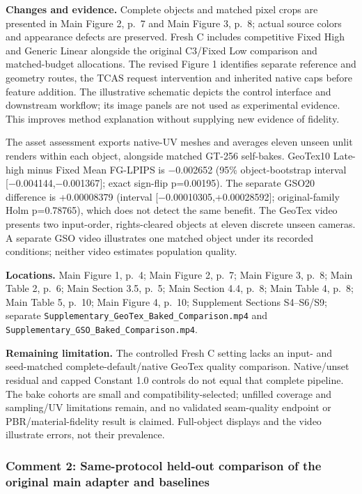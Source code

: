 \documentclass[
  10pt,
]{article}
\begin{document}
\textbf{Changes and evidence.} Complete objects and matched pixel crops
are presented in Main Figure 2, p.~7 and Main Figure 3, p.~8; actual
source colors and appearance defects are preserved. Fresh C includes
competitive Fixed High and Generic Linear alongside the original
C3/Fixed Low comparison and matched-budget allocations. The revised
Figure 1 identifies separate reference and geometry routes, the TCAS
request intervention and inherited native caps before feature addition.
The illustrative schematic depicts the control interface and downstream
workflow; its image panels are not used as experimental evidence. This
improves method explanation without supplying new evidence of fidelity.

The asset assessment exports native-UV meshes and averages eleven unseen
unlit renders within each object, alongside matched GT-256 self-bakes.
GeoTex10 Late-high minus Fixed Mean FG-LPIPS is −0.002652 (95\%
object-bootstrap interval {[}−0.004144,−0.001367{]}; exact sign-flip
p=0.00195). The separate GSO20 difference is +0.00008379 (interval
{[}−0.00010305,+0.00028592{]}; original-family Holm p=0.78765), which
does not detect the same benefit. The GeoTex video presents two
input-order, rights-cleared objects at eleven discrete unseen cameras. A
separate GSO video illustrates one matched object under its recorded
conditions; neither video estimates population quality.

\textbf{Locations.} Main Figure 1, p.~4; Main Figure 2, p.~7; Main
Figure 3, p.~8; Main Table 2, p.~6; Main Section 3.5, p.~5; Main Section
4.4, p.~8; Main Table 4, p.~8; Main Table 5, p.~10; Main Figure 4,
p.~10; Supplement Sections S4--S6/S9; separate
\texttt{Supplementary\_GeoTex\_Baked\_Comparison.mp4} and
\texttt{Supplementary\_GSO\_Baked\_Comparison.mp4}.

\textbf{Remaining limitation.} The controlled Fresh C setting lacks an
input- and seed-matched complete-default/native GeoTex quality
comparison. Native/unset residual and capped Constant 1.0 controls do
not equal that complete pipeline. The bake cohorts are small and
compatibility-selected; unfilled coverage and sampling/UV limitations
remain, and no validated seam-quality endpoint or PBR/material-fidelity
result is claimed. Full-object displays and the video illustrate errors,
not their prevalence.

\hypertarget{comment-2-same-protocol-held-out-comparison-of-the-original-main-adapter-and-baselines}{%
\subsubsection{Comment 2: Same-protocol held-out comparison of the
original main adapter and
baselines}\label{comment-2-same-protocol-held-out-comparison-of-the-original-main-adapter-and-baselines}}
\end{document}
